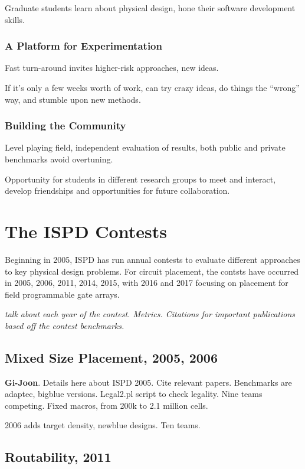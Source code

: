 \documentclass[sigconf]{acmart}
\begin{document}
Graduate students learn about physical design, hone their software
development skills.


\subsubsection{A Platform for Experimentation}

Fast turn-around invites higher-risk approaches, new ideas.

If it's only a few weeks worth of work, can try crazy
ideas, do things the ``wrong'' way, and stumble upon new
methods.

\subsubsection{Building the Community}

Level playing field, independent evaluation of results,
both public and private benchmarks avoid overtuning.

Opportunity for students in different research groups
to meet and interact, develop friendships and opportunities
for future collaboration.



\section{The ISPD Contests}

Beginning in 2005, ISPD has run annual contests to evaluate
different approaches to key physical design problems.  For circuit
placement, the contsts have occurred in 2005, 2006, 2011, 2014,
2015, with 2016 and 2017 focusing on placement for
field programmable gate arrays.

{\em talk about each year of the contest.  Metrics.  Citations
  for important publications based off the contest benchmarks.}

\subsection{Mixed Size Placement, 2005, 2006}

{\bf Gi-Joon}.  
\cite{ISPD05_contest}
Details here about ISPD 2005.  Cite relevant papers.
Benchmarks are adaptec, bigblue versions.  Legal2.pl script to
check legality.  Nine teams competing.
Fixed macros, from 200k to 2.1 million cells.

2006 adds target density, newblue designs.  Ten teams.  

\subsection{Routability, 2011}
\end{document}
